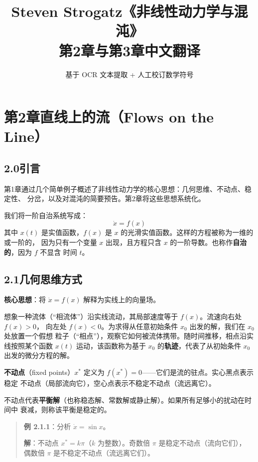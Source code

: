 \documentclass[12pt,a4paper]{article}
\title{\textbf{Steven Strogatz《非线性动力学与混沌》\\[4pt] 第2章与第3章\quad 中文翻译}}
\author{基于 OCR 文本提取 + 人工校订数学符号}
\date{}
\begin{document}
\maketitle

\section{第2章\quad 直线上的流（Flows on the Line）}

\subsection{2.0\quad 引言}

第1章通过几个简单例子概述了非线性动力学的核心思想：几何思维、不动点、稳定性、
分岔，以及对混沌的简要预告。第2章将这些思想系统化。

我们将一阶自治系统写成：
\begin{equation}
\dot{x} = f(x)
\end{equation}
其中 $x(t)$ 是实值函数，$f(x)$ 是 $x$ 的光滑实值函数。这样的方程被称为一维的或一阶的，
因为只有一个变量 $x$ 出现，且方程只含 $x$ 的一阶导数。也称作\textbf{自治的}，因为 $f$ 不显含
时间 $t$。

\subsection{2.1\quad 几何思维方式}

\textbf{核心思想}：将 $\dot{x} = f(x)$ 解释为实线上的向量场。

想象一种流体（``相流体''）沿实线流动，其局部速度等于 $f(x)$。流速向右处 $f(x) > 0$，
向左处 $f(x) < 0$。为求得从任意初始条件 $x_0$ 出发的解，我们在 $x_0$ 处放置一个假想
粒子（``相点''），观察它如何被流体携带。随时间推移，相点沿实线按照某个函数 $x(t)$
运动，该函数称为基于 $x_0$ 的\textbf{轨迹}，代表了从初始条件 $x_0$ 出发的微分方程的解。

\textbf{不动点}（fixed points）$x^*$ 定义为 $f(x^*) = 0$——它们是流的驻点。实心黑点表示稳定
不动点（局部流向它），空心点表示不稳定不动点（流远离它）。

不动点代表\textbf{平衡解}（也称稳态解、常数解或静止解）。如果所有足够小的扰动在时间中
衰减，则称该平衡是稳定的。

\begin{quote}
\textbf{例 2.1.1}：分析 $\dot{x} = \sin x$。

\textbf{解}：不动点 $x^* = k\pi$（$k$ 为整数）。奇数倍 $\pi$ 是稳定不动点（流向它们），
偶数倍 $\pi$ 是不稳定不动点（流远离它们）。
\end{quote}
\end{document}
